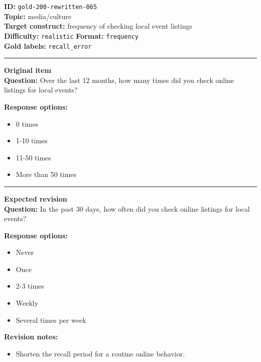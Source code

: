\documentclass[10pt,a4paper]{article}
\newcommand{\sectionline}{\vspace{0.15em}\hrule\vspace{0.35em}}
\begin{document}
\begin{tcolorbox}[colframe=FlawRed,colback=white,colbacktitle=FlawRed!9,coltitle=black,title={Item 065\hfill Flawed item}]
\textbf{ID:} \texttt{gold-200-rewritten-065}\\
\textbf{Topic:} media/culture\\
\textbf{Target construct:} frequency of checking local event listings\\
\textbf{Difficulty:} \texttt{realistic} \quad \textbf{Format:} \texttt{frequency}\\
\textbf{Gold labels:} \texttt{recall\_error}\\
\sectionline
\textbf{Original item}\\
\textbf{Question:} Over the last 12 months, how many times did you check online listings for local events?
\par\textbf{Response options:}
\begin{itemize}
\item 0 times
\item 1-10 times
\item 11-50 times
\item More than 50 times
\end{itemize}
\sectionline
\textbf{Expected revision}\\
\textbf{Question:} In the past 30 days, how often did you check online listings for local events?
\par\textbf{Response options:}
\begin{itemize}
\item Never
\item Once
\item 2-3 times
\item Weekly
\item Several times per week
\end{itemize}
\par\textbf{Revision notes:}
\begin{itemize}
\item Shorten the recall period for a routine online behavior.
\end{itemize}
\end{tcolorbox}
\end{document}

